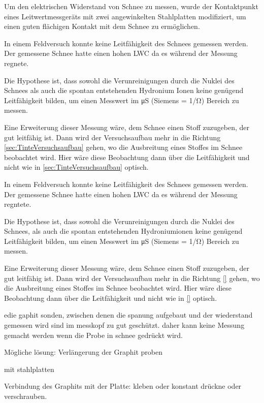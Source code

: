 Um den elektrischen Widerstand von Schnee zu messen, wurde der Kontaktpunkt eines Leitwertmessgeräts mit zwei angewinkelten Stahlplatten modifiziert, um einen guten flächigen Kontakt mit dem Schnee zu ermöglichen.

In einem Feldversuch konnte keine Leitfähigkeit des Schnees gemessen werden. Der gemessene Schnee hatte einen hohen LWC da es während der Messung regnete.


Die Hypothese ist, dass sowohl die Verunreinigungen durch die Nuklei des Schnees als auch die spontan entstehenden Hydronium Ionen  keine genügend Leitfähigkeit bilden,  um einen Messwert im \si{\micro\siemens} (Siemens = \si{1/\ohm}) Bereich zu messen.

Eine Erweiterung dieser Messung wäre, dem Schnee einen Stoff zuzugeben, der gut leitfähig ist. Dann wird der Versuchsaufbau mehr in die Richtung \ref{sec:TinteVersuchsaufbau} gehen, wo die Ausbreitung eines Stoffes im Schnee beobachtet wird. Hier wäre diese Beobachtung dann über die Leitfähigkeit und nicht wie in \ref{sec:TinteVersuchsaufbau} optisch.



\iffalse
In einem Feldversuch konnte keine Leitfähigkeit des Schnees gemessen werden. Der gemessene Schnee hatte einen hohen LWC da es während der Messung regntete.


Die Hypothese ist, dass sowohl die Verunreinigungen durch die Nuklei des Schnees, als auch die spontan entstehenden Hydroniumionen  keine genügend Leitfähigkeit bilden,  um einen Messwert im \si{\micro\siemens} (Siemens = \si{1/\ohm}) Bereich zu messen.

Eine Erweiterung dieser Messung wäre, dem Schnee einen Stoff zuzugeben, der gut leitfähig ist. Dann wird der Versuchsaufbau mehr in die Richtung \ref{} gehen, wo die Ausbreitung eines Stoffes im Schnee beobachtet wird. Hier wäre diese Beobachtung dann über die Leitfähigkeit und nicht wie in \ref{} optisch.




edie gaphit sonden, zwischen denen die spanung aufgebaut und der wiederstand gemessen wird sind im messkopf zu gut geschützt. daher kann keine Messung gemacht werden wenn die Probe in schnee gedrückt wird.

Mögliche lösung: Verlängerung der Graphit proben

mit stahlplatten

Verbindung des Graphits mit der Platte: kleben oder konstant drückne oder verschrauben.

